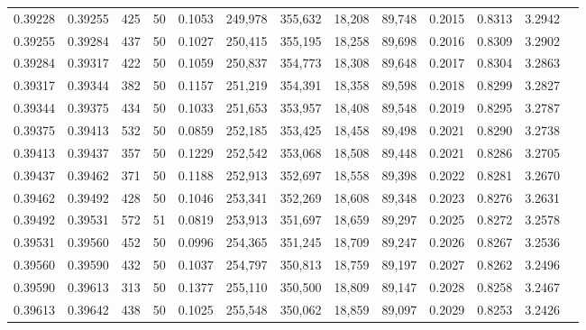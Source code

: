 \begin{tabular}{rrrrrrrrrrrrr}
0.39228 & 0.39255 &   425 &  50 &                                     0.1053 & 249,978 & 355,632 &  18,208 &  89,748 & 0.2015 & 0.8313 & 3.2942 \\
0.39255 & 0.39284 &   437 &  50 &                                     0.1027 & 250,415 & 355,195 &  18,258 &  89,698 & 0.2016 & 0.8309 & 3.2902 \\
0.39284 & 0.39317 &   422 &  50 &                                     0.1059 & 250,837 & 354,773 &  18,308 &  89,648 & 0.2017 & 0.8304 & 3.2863 \\
0.39317 & 0.39344 &   382 &  50 &                                     0.1157 & 251,219 & 354,391 &  18,358 &  89,598 & 0.2018 & 0.8299 & 3.2827 \\
0.39344 & 0.39375 &   434 &  50 &                                     0.1033 & 251,653 & 353,957 &  18,408 &  89,548 & 0.2019 & 0.8295 & 3.2787 \\
0.39375 & 0.39413 &   532 &  50 &                                     0.0859 & 252,185 & 353,425 &  18,458 &  89,498 & 0.2021 & 0.8290 & 3.2738 \\
0.39413 & 0.39437 &   357 &  50 &                                     0.1229 & 252,542 & 353,068 &  18,508 &  89,448 & 0.2021 & 0.8286 & 3.2705 \\
0.39437 & 0.39462 &   371 &  50 &                                     0.1188 & 252,913 & 352,697 &  18,558 &  89,398 & 0.2022 & 0.8281 & 3.2670 \\
0.39462 & 0.39492 &   428 &  50 &                                     0.1046 & 253,341 & 352,269 &  18,608 &  89,348 & 0.2023 & 0.8276 & 3.2631 \\
0.39492 & 0.39531 &   572 &  51 &                                     0.0819 & 253,913 & 351,697 &  18,659 &  89,297 & 0.2025 & 0.8272 & 3.2578 \\
0.39531 & 0.39560 &   452 &  50 &                                     0.0996 & 254,365 & 351,245 &  18,709 &  89,247 & 0.2026 & 0.8267 & 3.2536 \\
0.39560 & 0.39590 &   432 &  50 &                                     0.1037 & 254,797 & 350,813 &  18,759 &  89,197 & 0.2027 & 0.8262 & 3.2496 \\
0.39590 & 0.39613 &   313 &  50 &                                     0.1377 & 255,110 & 350,500 &  18,809 &  89,147 & 0.2028 & 0.8258 & 3.2467 \\
0.39613 & 0.39642 &   438 &  50 &                                     0.1025 & 255,548 & 350,062 &  18,859 &  89,097 & 0.2029 & 0.8253 & 3.2426 \\

\end{tabular}
